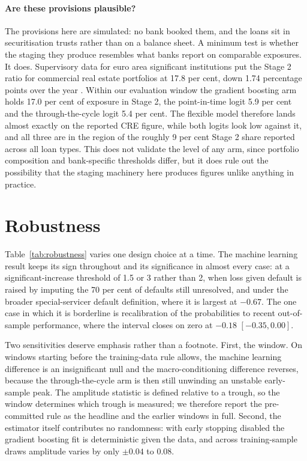 \documentclass[11pt]{article}
\begin{document}
\paragraph{Are these provisions plausible?} The provisions here are simulated: no bank booked them, and the
loans sit in securitisation trusts rather than on a balance sheet. A minimum test is whether the staging they
produce resembles what banks report on comparable exposures. It does. Supervisory data for euro area significant
institutions put the Stage 2 ratio for commercial real estate portfolios at 17.8 per cent, down 1.74 percentage
points over the year \citep{ecb2025annual}. Within our evaluation window the gradient boosting arm holds 17.0 per
cent of exposure in Stage 2, the point-in-time logit 5.9 per cent and the through-the-cycle logit 5.4 per cent.
The flexible model therefore lands almost exactly on the reported CRE figure, while both logits look low against
it, and all three are in the region of the roughly 9 per cent Stage 2 share reported across all loan types. This
does not validate the level of any arm, since portfolio composition and bank-specific thresholds differ, but it
does rule out the possibility that the staging machinery here produces figures unlike anything in practice.

\section{Robustness}
\label{sec:robustness}

\begin{table}[t]\centering
  \caption{Paired differences in relative amplitude under alternative specifications, with 95 per cent
  deal-clustered bootstrap intervals.}
  \label{tab:robustness}
  
\end{table}

Table~\ref{tab:robustness} varies one design choice at a time. The machine learning result keeps its sign
throughout and its significance in almost every case: at a significant-increase threshold of 1.5 or 3 rather than
2, when loss given default is raised by imputing the 70 per cent of defaults still unresolved, and under the
broader special-servicer default definition, where it is largest at $-0.67$. The one case in which it is
borderline is recalibration of the probabilities to recent out-of-sample performance, where the interval closes
on zero at $-0.18$ $[-0.35, 0.00]$.

Two sensitivities deserve emphasis rather than a footnote. First, the window. On windows starting before the
training-data rule allows, the machine learning difference is an insignificant null and the macro-conditioning
difference reverses, because the through-the-cycle arm is then still unwinding an unstable early-sample peak. The
amplitude statistic is defined relative to a trough, so the window determines which trough is measured; we
therefore report the pre-committed rule as the headline and the earlier windows in full. Second, the estimator
itself contributes no randomness: with early stopping disabled the gradient boosting fit is deterministic given
the data, and across training-sample draws amplitude varies by only $\pm 0.04$ to $0.08$.
\end{document}
